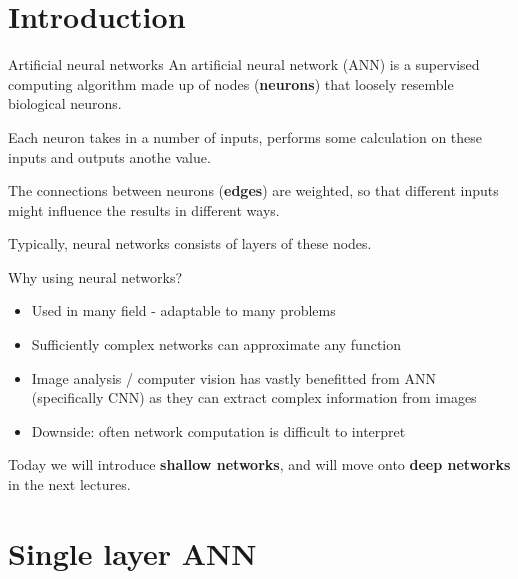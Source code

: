 \documentclass[9pt, aspectratio=169]{beamer}
\begin{document}
\begin{frame}
\begin{columns}
\begin{column}{0.2\textwidth}
        \end{column}
    \end{columns}
\end{frame}

\section{Introduction}

\begin{frame}
    {Artificial neural networks}
    An artificial neural network (ANN) is a supervised computing algorithm made up of nodes (\textbf{neurons}) that loosely resemble biological neurons.

    \pause

    Each neuron takes in a number of inputs, performs some calculation on these inputs and outputs anothe value.

    The connections between neurons (\textbf{edges}) are weighted, so that different inputs might influence the results in different ways.

    Typically, neural networks consists of layers of these nodes.
\end{frame}

\begin{frame}
    {Why using neural networks?}

    \begin{itemize}
        \item Used in many field - adaptable to many problems
        \item Sufficiently complex networks can approximate any function
        \item Image analysis / computer vision has vastly benefitted from ANN (specifically CNN) as they can extract complex information from images
        \item Downside: often network computation is difficult to interpret
    \end{itemize}
    \pause

    Today we will introduce \textbf{shallow networks}, and will move onto \textbf{deep networks} in the next lectures.
\end{frame}

\section{Single layer ANN}
\end{document}
